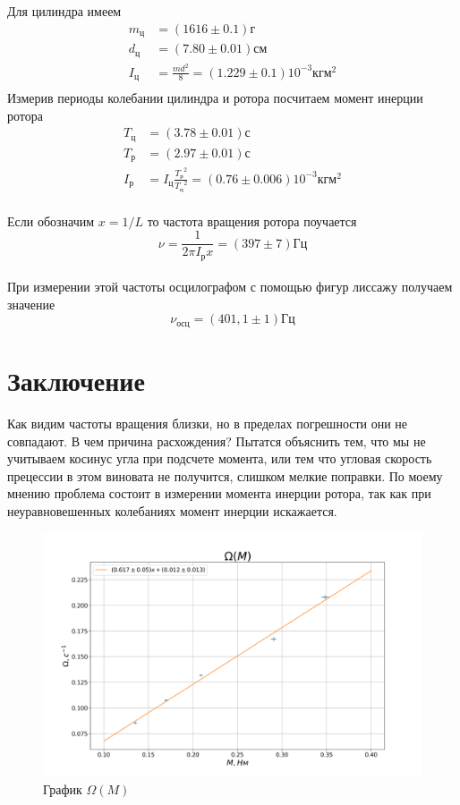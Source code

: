 \documentclass[a4paper, 12pt]{article}
\begin{document}
    Для цилиндра имеем
    \begin{align*}
     m_{ц} &= (1616 \pm 0.1)г\\
     d_{ц} &= (7.80 \pm 0.01)см\\
     I_{ц} &= \frac{md^2}{8} = (1.229 \pm 0.1) 10^{-3} кгм^2\\
    \end{align*}
    Измерив периоды колебании цилиндра и ротора посчитаем момент инерции ротора
    \begin{align*}
     T_{ц} &= (3.78 \pm 0.01)с\\
     T_{р} &= (2.97 \pm 0.01)с\\
     I_{р} &= I_{ц} \frac{{T_р}^2}{{T_ц}^2} = (0.76 \pm 0.006)10^{-3} кгм^2
    \end{align*}
    \paragraph{}
    Если обозначим $x=1/L$ то частота вращения ротора поучается
    \[\nu = \frac{1}{2\pi I_р x} = (397 \pm 7)Гц\]

    \paragraph{}
    При измерении этой частоты осцилографом с помощью фигур лиссажу получаем значение
    \[\nu_{осц}=(401,1 \pm 1)Гц\]

    \section{Заключение}
    Как видим частоты вращения близки, но в пределах погрешности они не совпадают. В чем причина расхождения? Пытатся объяснить тем, что мы не учитываем косинус угла при подсчете момента, или тем что угловая скорость прецессии в этом виновата не получится, слишком мелкие поправки. По моему мнению проблема состоит в измерении момента инерции ротора, так как при неуравновешенных колебаниях момент инерции искажается.


    \newpage
    \begin{figure}
        \includegraphics[width=1.20\textwidth]{plot.png}
        \caption{График $\Omega(M)$}
    \end{figure}
\end{document}
